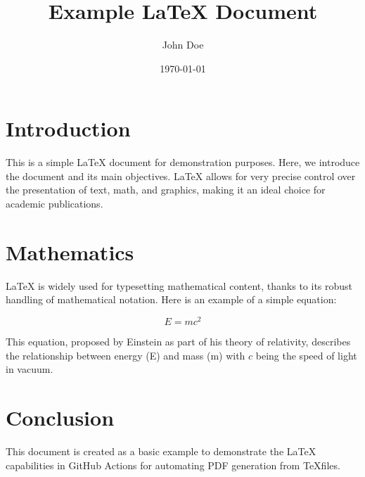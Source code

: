\documentclass{article}
\title{Example LaTeX Document}
\author{John Doe}
\date{\today}
\begin{document}
\maketitle

\section{Introduction}
This is a simple LaTeX document for demonstration purposes. Here, we introduce the document and its main objectives. LaTeX allows for very precise control over the presentation of text, math, and graphics, making it an ideal choice for academic publications.

\section{Mathematics}
LaTeX is widely used for typesetting mathematical content, thanks to its robust handling of mathematical notation. Here is an example of a simple equation:

\begin{equation}
    E = mc^2
\end{equation}

This equation, proposed by Einstein as part of his theory of relativity, describes the relationship between energy (E) and mass (m) with \( c \) being the speed of light in vacuum.

\section{Conclusion}
This document is created as a basic example to demonstrate the LaTeX capabilities in GitHub Actions for automating PDF generation from \TeX files.
\end{document}
